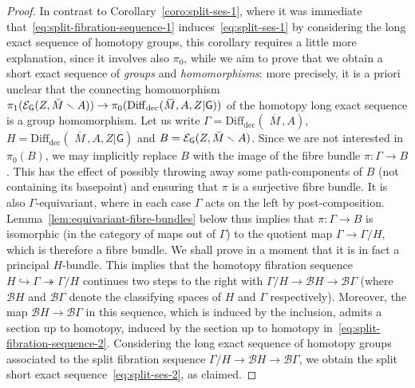 \documentclass[AHL,Unicode,published]{cedram}
\newcommand{\rdec}{\mathrm{dec}}
\newcommand{\mbar}{\ensuremath{{\,\,\overline{\!\! M\!}\,}}}
\newcommand{\sB}{\mathscr{B}}
\newcommand{\sG}{\mathsf{G}}
\newcommand{\cE}{\mathcal{E}}
\newcommand{\diffdec}{\ensuremath{\mathrm{Diff}_{\rdec}}}
\begin{document}
\begin{proof}
In contrast to Corollary~\ref{coro:split-ses-1}, where it was immediate that~\eqref{eq:split-fibration-sequence-1} induces~\eqref{eq:split-ses-1} by considering the long exact sequence of homotopy groups, this corollary requires a little more explanation, since it involves also $\pi_{0}$, while we aim to prove that we obtain a short exact sequence of \emph{groups} and \emph{homomorphisms}: more precisely, it is a priori unclear that the connecting homomorphism $\pi_{1}(\cE_{\sG}(Z,\Breve{M} \smallsetminus A))\linebreak\to \pi_{0}(\diffdec(\mbar,A,Z|\sG))$ of the homotopy long exact sequence is a group homomorphism. Let us write $\Gamma = \diffdec(\mbar,A)$, $H = \diffdec(\mbar,A,Z|\sG)$ and $B = \cE_{\sG}(Z,\Breve{M} \smallsetminus A)$. Since we are not interested in $\pi_{0}(B)$, we may implicitly replace $B$ with the image of the fibre bundle $\pi \colon \Gamma \to B$. This has the effect of possibly throwing away some path-components of $B$ (not containing its basepoint) and ensuring that $\pi$ is a surjective fibre bundle. It is also $\Gamma$-equivariant, where in each case $\Gamma$ acts on the left by post-composition. Lemma~\ref{lem:equivariant-fibre-bundles} below thus implies that $\pi \colon \Gamma \to B$ is isomorphic (in the category of maps out of $\Gamma$) to the quotient map $\Gamma \to \Gamma/H$, which is therefore a fibre bundle. We shall prove in a moment that it is in fact a principal $H$-bundle. This implies that the homotopy fibration sequence $H \hookrightarrow \Gamma \twoheadrightarrow \Gamma/H$ continues two steps to the right with $\Gamma/H \to \sB H \to \sB \Gamma$ (where $\sB H$ and $\sB \Gamma$ denote the classifying spaces of $H$ and $\Gamma$ respectively). Moreover, the map $\sB H \to \sB \Gamma$ in this sequence, which is induced by the inclusion, admits a section up to homotopy, induced by the section up to homotopy in~\eqref{eq:split-fibration-sequence-2}. Considering the long exact sequence of homotopy groups associated to the split fibration sequence $\Gamma/H \to \sB H \to \sB \Gamma$, we obtain the split short exact sequence~\eqref{eq:split-ses-2}, as claimed.


\end{proof}
\end{document}
